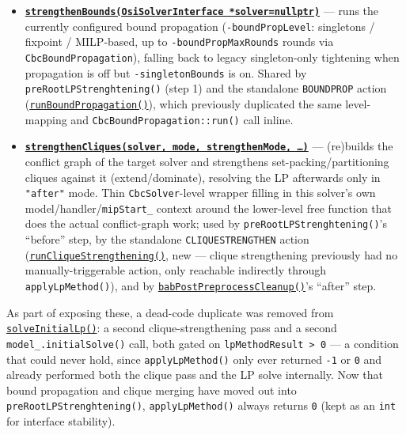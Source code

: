 \documentclass[10pt]{article}
\newcommand{\GHBASE}{https://github.com/coin-or/Cbc/blob/next/src}
\newcommand{\ghc}[2]{\href{\GHBASE/CbcSolver.cpp\#L#1}{#2}}
\newcommand{\swatch}[1]{\tikz[baseline=-0.6ex]{\fill[#1] (0,0) rectangle (0.32,0.32);}}
\begin{document}
\begin{itemize}[leftmargin=1.4em, itemsep=1pt]
    time limits). \texttt{forcedMethod}
    lets a caller pin the LP method (a \texttt{CbcParameters::LPMethod} value) for this call
    only, bypassing \texttt{-lpMethod=auto}/\texttt{recommend} and LP racing --- used by the \texttt{DUALSIMPLEX}/\texttt{PRIMALSIMPLEX}/
    \texttt{BARRIER} CLI commands, which used to hand-duplicate this entire option-setting sequence instead of
    calling it. Used internally by \ghc{5620}{\texttt{solveInitialLp()}} (root LP of the BAB pipeline) and, via
    \ghc{1617}{\texttt{runSolveContinuous()}}, by the \texttt{SOLVECONTINUOUS}/\texttt{DUALSIMPLEX}/\texttt{PRIMALSIMPLEX}/
    \texttt{BARRIER} actions; exposed publicly so the exact same, fully-configured solve (with any forced method)
    can be driven on any solver instance.
  \item \textbf{\swatch{capi} \ghc{1135}{\texttt{strengthenBounds(OsiSolverInterface\,*solver=nullptr)}}} ---
    runs the currently configured bound propagation (\texttt{-boundPropLevel}: singletons / fixpoint /
    MILP-based, up to \texttt{-boundPropMaxRounds} rounds via \texttt{CbcBoundPropagation}), falling back
    to legacy singleton-only tightening when propagation is off but \texttt{-singletonBounds} is on. Shared by
    \texttt{preRootLPStrenghtening()} (step 1) and the standalone \texttt{BOUNDPROP} action
    (\ghc{7123}{\texttt{runBoundPropagation()}}), which previously duplicated the same level-mapping and
    \texttt{CbcBoundPropagation::run()} call inline.
  \item \textbf{\swatch{capi} \ghc{1198}{\texttt{strengthenCliques(solver, mode, strengthenMode, \ldots)}}} ---
    (re)builds the conflict graph of the target solver and strengthens set-packing/partitioning cliques against
    it (extend/dominate), resolving the LP afterwards only in \texttt{"after"} mode. Thin \texttt{CbcSolver}-level
    wrapper filling in this solver's own model/handler/\texttt{mipStart\_} context around the lower-level free
    function that does the actual conflict-graph work; used by \texttt{preRootLPStrenghtening()}'s ``before''
    step, by the standalone \texttt{CLIQUESTRENGTHEN} action (\ghc{7147}{\texttt{runCliqueStrengthening()}}, new
    --- clique strengthening previously had no manually-triggerable action, only reachable indirectly through
    \texttt{applyLpMethod()}), and by \ghc{7845}{\texttt{babPostPreprocessCleanup()}}'s ``after'' step.
\end{itemize}
As part of exposing these, a dead-code duplicate was removed from \ghc{5620}{\texttt{solveInitialLp()}}: a
second clique-strengthening pass and a second \texttt{model\_.initialSolve()} call, both gated on
\texttt{lpMethodResult > 0} --- a condition that could never hold, since \texttt{applyLpMethod()} only ever
returned \texttt{-1} or \texttt{0} and already performed both the clique pass and the LP solve internally. Now
that bound propagation and clique merging have moved out into \texttt{preRootLPStrenghtening()},
\texttt{applyLpMethod()} always returns \texttt{0} (kept as an \texttt{int} for interface stability).
\end{document}
